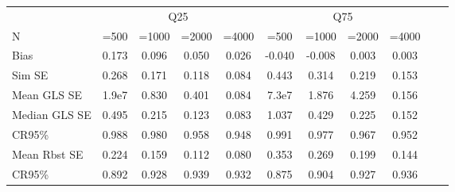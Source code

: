 
\begin{tabular}[hbt!]{l*{10}{c}}
\hline 
            &      \multicolumn{4}{c}{Q25}   &      \multicolumn{4}{c}{Q75}   &\\
    N        &  =500& =1000 & =2000     &    =4000 &  =500& =1000 & =2000     &   =4000 & \\
\hline
Bias     &       0.173&       0.096&       0.050&       0.026&      -0.040&      -0.008&       0.003&       0.003\\
Sim SE         &       0.268&       0.171&       0.118&       0.084&       0.443&       0.314&       0.219&       0.153\\
Mean GLS SE      &1.9e7&       0.830&       0.401&       0.084&7.3e7 &       1.876&       4.259&       0.156\\
Median GLS SE     &       0.495&       0.215&       0.123&       0.083&       1.037&       0.429&       0.225&       0.152\\
CR95\%        &       0.988&       0.980&       0.958&       0.948&       0.991&       0.977&       0.967&       0.952\\
Mean Rbst SE     &       0.224&       0.159&       0.112&       0.080&       0.353&       0.269&       0.199&       0.144\\
CR95\%       &       0.892&       0.928&       0.939&       0.932&       0.875&       0.904&       0.927&       0.936\\
\hline 
\end{tabular}

